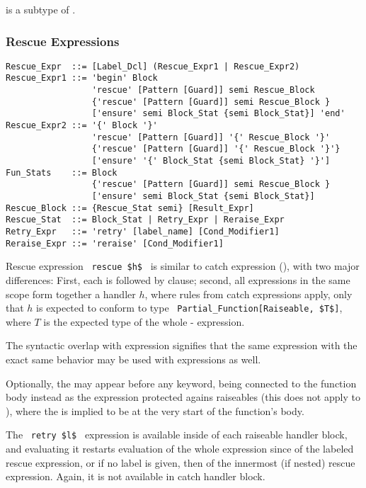  is a subtype of . 







\subsubsection{Rescue Expressions}

\syntax\begin{lstlisting}
Rescue_Expr  ::= [Label_Dcl] (Rescue_Expr1 | Rescue_Expr2)
Rescue_Expr1 ::= 'begin' Block 
                 'rescue' [Pattern [Guard]] semi Rescue_Block
                 {'rescue' [Pattern [Guard]] semi Rescue_Block }
                 ['ensure' semi Block_Stat {semi Block_Stat}] 'end'
Rescue_Expr2 ::= '{' Block '}' 
                 'rescue' [Pattern [Guard]] '{' Rescue_Block '}'
                 {'rescue' [Pattern [Guard]] '{' Rescue_Block '}'}
                 ['ensure' '{' Block_Stat {semi Block_Stat} '}']
Fun_Stats    ::= Block
                 {'rescue' [Pattern [Guard]] semi Rescue_Block }
                 ['ensure' semi Block_Stat {semi Block_Stat}]
Rescue_Block ::= {Rescue_Stat semi} [Result_Expr]
Rescue_Stat  ::= Block_Stat | Retry_Expr | Reraise_Expr
Retry_Expr   ::= 'retry' [label_name] [Cond_Modifier1]
Reraise_Expr ::= 'reraise' [Cond_Modifier1]
\end{lstlisting}

Rescue expression ~\lstinline!rescue $h$!~ is similar to catch expression (), with two major differences: First, each  is followed by  clause; second, all  expressions in the same scope form together a handler $h$, where rules from catch expressions apply, only that $h$ is expected to conform to type ~\lstinline!Partial_Function[Raiseable, $T$]!, where $T$ is the expected type of the whole - expression. 

The syntactic overlap with  expression signifies that the same expression with the exact same behavior may be used with  expressions as well. 

Optionally, the  may appear before any  keyword, being connected to the function body instead as the expression protected agains raiseables (this does not apply to ), where the  is implied to be at the very start of the function's body. 

The ~\lstinline!retry $l$!~ expression is available inside of each raiseable handler block, and evaluating it restarts evaluation of the whole expression since  of the labeled rescue expression, or if no label is given, then of the innermost (if nested) rescue expression. Again, it is not available in catch handler block. 

